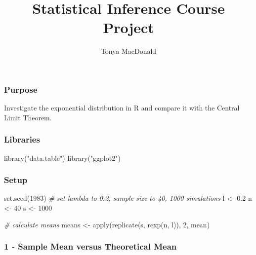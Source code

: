 \documentclass[
]{article}
\title{Statistical Inference Course Project}
\author{Tonya MacDonald}
\date{}
\newenvironment{Shaded}{\begin{snugshade}}{\end{snugshade}}
\newcommand{\CommentTok}[1]{\textcolor[rgb]{0.56,0.35,0.01}{\textit{#1}}}
\newcommand{\DecValTok}[1]{\textcolor[rgb]{0.00,0.00,0.81}{#1}}
\newcommand{\FloatTok}[1]{\textcolor[rgb]{0.00,0.00,0.81}{#1}}
\newcommand{\FunctionTok}[1]{\textcolor[rgb]{0.00,0.00,0.00}{#1}}
\newcommand{\NormalTok}[1]{#1}
\newcommand{\OtherTok}[1]{\textcolor[rgb]{0.56,0.35,0.01}{#1}}
\newcommand{\StringTok}[1]{\textcolor[rgb]{0.31,0.60,0.02}{#1}}
\begin{document}
\maketitle

\hypertarget{purpose}{%
\subsubsection{Purpose}\label{purpose}}

Investigate the exponential distribution in R and compare it with the
Central Limit Theorem.

\hypertarget{libraries}{%
\subsubsection{Libraries}\label{libraries}}

\begin{Shaded}
\begin{Highlighting}[]
\FunctionTok{library}\NormalTok{(}\StringTok{"data.table"}\NormalTok{)}
\FunctionTok{library}\NormalTok{(}\StringTok{"ggplot2"}\NormalTok{)}
\end{Highlighting}
\end{Shaded}

\hypertarget{setup}{%
\subsubsection{Setup}\label{setup}}

\begin{Shaded}
\begin{Highlighting}[]
\FunctionTok{set.seed}\NormalTok{(}\DecValTok{1983}\NormalTok{)}
\CommentTok{\# set lambda to 0.2, sample size to 40, 1000 simulations}
\NormalTok{l }\OtherTok{\textless{}{-}} \FloatTok{0.2}
\NormalTok{n }\OtherTok{\textless{}{-}} \DecValTok{40}
\NormalTok{s }\OtherTok{\textless{}{-}} \DecValTok{1000}

\CommentTok{\# calculate means}
\NormalTok{means }\OtherTok{\textless{}{-}} \FunctionTok{apply}\NormalTok{(}\FunctionTok{replicate}\NormalTok{(s, }\FunctionTok{rexp}\NormalTok{(n, l)), }\DecValTok{2}\NormalTok{, mean)}
\end{Highlighting}
\end{Shaded}

\hypertarget{sample-mean-versus-theoretical-mean}{%
\subsubsection{1 - Sample Mean versus Theoretical
Mean}\label{sample-mean-versus-theoretical-mean}}
\end{document}
